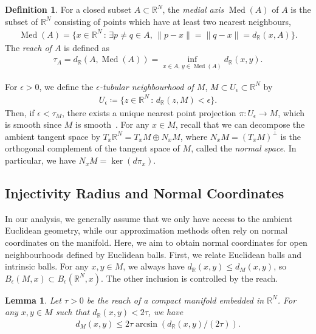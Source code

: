 \documentclass[11pt,reqno]{amsproc}
\numberwithin{equation}{section}
\newcommand{\R}{\mathbb{R}}
\newcommand{\Med}{\operatorname{Med}}
\newcommand{\ball}[3]{B_{#3}(#1, #2)} %
\newtheorem{lemma}[counter]{Lemma}
\theoremstyle{definition}
\newtheorem{definition}[counter]{Definition}
\theoremstyle{plain}
\begin{document}
    \begin{definition}{\cite[Definition 2.1]{aamari_estimating_2019}}
        For a closed subset $A \subset \R^N$, the \emph{medial axis} $\Med(A)$ of $A$ is the subset of $\R^N$ consisting of points which have at least two nearest neighbours,
        \begin{align}
            \Med(A) = \{ x \in \R^N \, : \, \exists p \neq q \in A, \, \|p-x\| = \|q-x\| = d_{\R}(x,A)\}.
        \end{align}
        The \emph{reach of $A$} is defined as 
        \begin{align}
            \tau_A = d_{\R}(A, \Med(A)) = \inf_{x \in A, \, y \in \Med(A)} d_{\R}(x,y).
    \end{align}
    \end{definition}
    For $\epsilon > 0$, we define the \emph{$\epsilon$-tubular neighbourhood of $M$}, $M \subset U_\epsilon \subset \R^N$ by
    \begin{align}
        U_\epsilon \coloneqq \{ z \in \R^N \, : \, d_\R(z, M) < \epsilon\}. 
    \end{align}
    Then, if $\epsilon < \tau_M$, there exists a unique nearest point projection $\pi: U_\epsilon \to M$, which is smooth since $M$ is smooth~\cite[Theorem 2]{leobacher_existence_2021}. For any $x \in M$, recall that we can decompose the ambient tangent space by $T_x \R^N = T_x M \oplus N_x M$, where $N_x M = (T_x M)^\perp$ is the orthogonal complement of the tangent space of $M$, called the \emph{normal space}. In particular, we have $N_x M = \ker(d\pi_x)$.




    \subsection{Injectivity Radius and Normal Coordinates} \label{ssec:normal_coordinates}
    In our analysis, we generally assume that we only have access to the ambient Euclidean geometry, while our approximation methods often rely on normal coordinates on the manifold. Here, we aim to obtain normal coordinates for open neighbourhoods defined by Euclidean balls. First, we relate Euclidean balls and intrinsic balls. For any $x, y \in M$, we always have $d_{\R}(x,y) \leq d_M(x,y)$, so $\ball{M}{x}{\epsilon} \subset \ball{\R^N}{x}{\epsilon}$.
    The other inclusion is controlled by the reach.

    \begin{lemma}{\cite[Lemma 3]{boissonnat_reach_2019}}
        Let $\tau > 0$ be the reach of a compact manifold embedded in $\R^N$. For any $x,y \in M$ such that $d_{\R}(x,y) < 2\tau$, we have
        \begin{align}
            d_M(x,y)\leq 2 \tau \arcsin\left( d_{\R}(x,y)/(2\tau)\right). 
        \end{align}
    \end{lemma}
\end{document}
